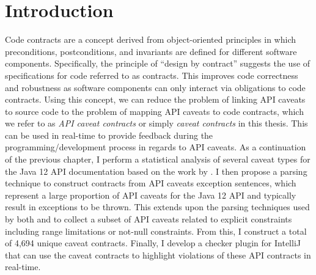 \section{Introduction}
\label{sec:contract-intro}
Code contracts are a concept derived from object-oriented principles in which preconditions, postconditions, and invariants are defined for different software components. Specifically, the principle of ``design by contract'' suggests the use of specifications for code referred to as contracts. This improves code correctness and robustness as software components can only interact via obligations to code contracts. Using this concept, we can reduce the problem of linking API caveats to source code to the problem of mapping API caveats to code contracts, which we refer to as \textit{API caveat contracts} or simply \textit{caveat contracts} in this thesis. This can be used in real-time to provide feedback during the programming/development process in regards to API caveats. As a continuation of the previous chapter, I perform a statistical analysis of several caveat types for the Java 12 API documentation based on the work by \cite{zhou-directive}. I then propose a parsing technique to construct contracts from API caveats exception sentences, which represent a large proportion of API caveats for the Java 12 API and typically result in exceptions to be thrown. This extends upon the parsing techniques used by both \cite{zhou-directive} and \cite{blasi2018translating} to collect a subset of API caveats related to explicit constraints including range limitations or not-null constraints. From this, I construct a total of 4,694 unique caveat contracts. Finally, I develop a checker plugin for IntelliJ that can use the caveat contracts to highlight violations of these API contracts in real-time. \\

